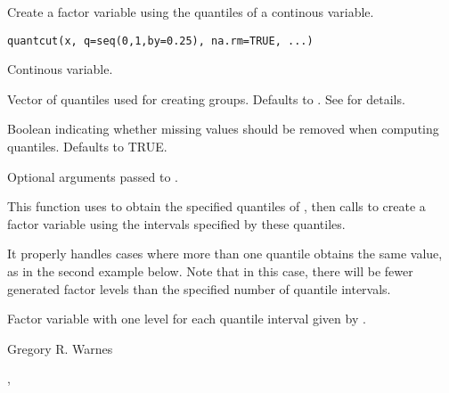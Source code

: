 \begin{Description}\relax
Create a factor variable using the quantiles of a continous variable.
\end{Description}
\begin{Usage}
\begin{verbatim}
quantcut(x, q=seq(0,1,by=0.25), na.rm=TRUE, ...)
\end{verbatim}
\end{Usage}
\begin{Arguments}
\begin{ldescription}
\item[\code{x}] Continous variable. 
\item[\code{q}] Vector of quantiles used for creating groups. Defaults to
.  See  for details. 
\item[\code{na.rm}] Boolean indicating whether missing values should be
removed when computing quantiles.  Defaults to TRUE.
\item[\code{...}] Optional arguments passed to . 
\end{ldescription}
\end{Arguments}
\begin{Details}\relax
This function uses  to obtain the specified
quantiles of , then calls  to create a factor
variable using the intervals specified by these quantiles.

It properly handles cases where more than one quantile obtains the
same value, as in the second example below.  Note that in this case,
there will be fewer generated factor levels than the specified number
of quantile intervals.
\end{Details}
\begin{Value}
Factor variable with one level for each quantile interval given by .
\end{Value}
\begin{Author}\relax
Gregory R. Warnes 
\end{Author}
\begin{SeeAlso}\relax
{}, 
\end{SeeAlso}
